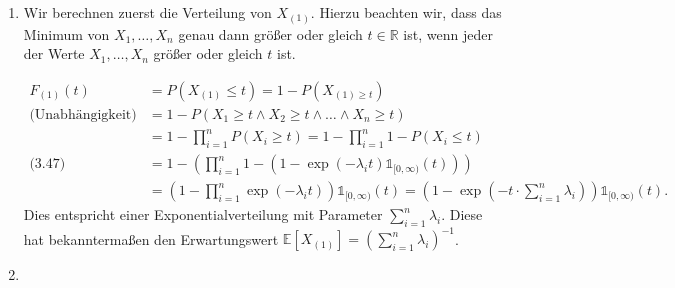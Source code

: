 \documentclass[a4paper]{article}
\begin{document}
\begin{enumerate}
	\item Wir berechnen zuerst die Verteilung von $X_{(1)}$. Hierzu beachten wir, dass das Minimum von $X_1, \dots, X_n$ genau dann größer oder gleich $t \in \mathds{R}$ ist, wenn jeder der Werte $X_1, \dots, X_n$ größer oder gleich $t$ ist.

	      \begin{align*}
		      F_{(1)}(t)              & = P(X_{(1)} \leq t) = 1 - P(X_{(1) \geq t})                                                                                                                                                              \\
		      \text{(Unabhängigkeit)} & = 1- P(X_1 \geq t \wedge X_2 \geq t \wedge \dots \wedge X_n \geq t)                                                                                                                                      \\
		                              & = 1 - \prod_{i=1}^{n} P(X_i \geq t) = 1- \prod_{i=1}^{n} 1 - P(X_i \leq t)                                                                                                                             & \\
		      \text{(3.47)}           & = 1 - \left(\prod_{i = 1}^{n} 1 - \left( 1 - \exp(- \lambda_i t) \mathds{1}_{[0, \infty)}(t)\right) \right)                                                                                              \\
		                              & = \left( 1 - \prod_{i = 1}^{n} \exp(- \lambda_i t) \right) \mathds{1}_{[0, \infty)}(t) = \left( 1 - \exp\left( -t \cdot \sum_{i =1}^{n} \lambda_i  \right) \right) \mathds{1}_{[0, \infty)}(t)\text{.}
	      \end{align*}
	      Dies entspricht einer Exponentialverteilung mit Parameter $\sum_{i=1}^{n} \lambda_i$. Diese hat bekanntermaßen den Erwartungswert $\mathds{E}[X_{(1)}] = \left(\sum_{i=1}^{n} \lambda_i\right)^{-1}$.
	\item


\end{enumerate}
\end{document}
